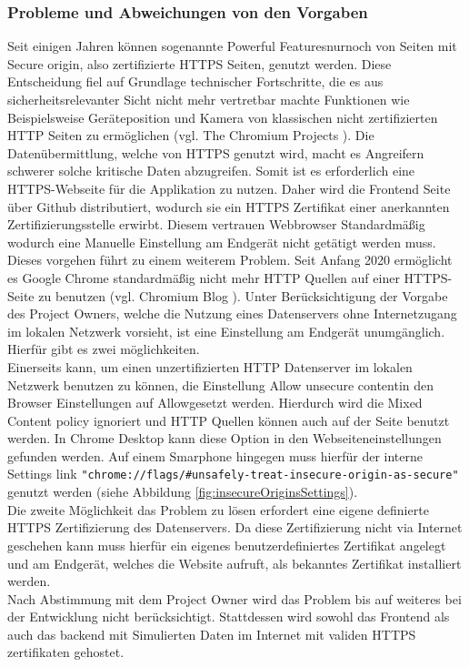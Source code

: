 \subsubsection{Probleme und Abweichungen von den Vorgaben}
Seit einigen Jahren können sogenannte \grqq Powerful Features\grqq\space nurnoch von Seiten mit \grqq Secure origin\grqq , also zertifizierte HTTPS Seiten, genutzt werden. Diese Entscheidung fiel auf Grundlage technischer Fortschritte, die es aus sicherheitsrelevanter Sicht nicht mehr vertretbar machte Funktionen wie Beispielsweise Geräteposition und Kamera von klassischen nicht zertifizierten HTTP Seiten zu ermöglichen (vgl. The Chromium Projects \cite{CameraHTTPSOnly}). Die Datenübermittlung, welche von HTTPS genutzt wird, macht es Angreifern schwerer solche kritische Daten abzugreifen. Somit ist es erforderlich eine HTTPS-Webseite für die Applikation zu nutzen. Daher wird die Frontend Seite über Github distributiert, wodurch sie ein HTTPS Zertifikat einer anerkannten Zertifizierungsstelle erwirbt. Diesem vertrauen Webbrowser Standardmäßig wodurch eine Manuelle Einstellung am Endgerät nicht getätigt werden muss.\\
Dieses vorgehen führt zu einem weiterem Problem. Seit Anfang 2020 ermöglicht es Google Chrome standardmäßig nicht mehr HTTP Quellen auf einer HTTPS-Seite zu benutzen (vgl. Chromium Blog \cite{MixedSourcesPolicy}). Unter Berücksichtigung der Vorgabe des Project Owners, welche die Nutzung eines Datenservers ohne Internetzugang im lokalen Netzwerk vorsieht, ist eine Einstellung am Endgerät unumgänglich. Hierfür gibt es zwei möglichkeiten.\\
Einerseits kann, um einen unzertifizierten HTTP Datenserver im lokalen Netzwerk benutzen zu können, die Einstellung \grqq Allow unsecure content\grqq\space in den Browser Einstellungen auf \grqq Allow\grqq\space gesetzt werden. Hierdurch wird die Mixed Content policy ignoriert und HTTP Quellen können auch auf der Seite benutzt werden. In Chrome Desktop kann diese Option in den Webseiteneinstellungen gefunden werden. Auf einem Smarphone hingegen muss hierfür der interne Settings link \verb|"chrome://flags/#unsafely-treat-insecure-origin-as-secure"| genutzt werden (siehe Abbildung \ref{fig:insecureOriginsSettings}).\\
Die zweite Möglichkeit das Problem zu lösen erfordert eine eigene definierte HTTPS Zertifizierung des Datenservers. Da diese Zertifizierung nicht via Internet geschehen kann muss hierfür ein eigenes benutzerdefiniertes Zertifikat angelegt und am Endgerät, welches die Website aufruft, als bekanntes Zertifikat installiert werden.\\ 
Nach Abstimmung mit dem Project Owner wird das Problem bis auf weiteres bei der Entwicklung nicht berücksichtigt. Stattdessen wird sowohl das Frontend als auch das backend mit Simulierten Daten im Internet mit validen HTTPS zertifikaten gehostet.

